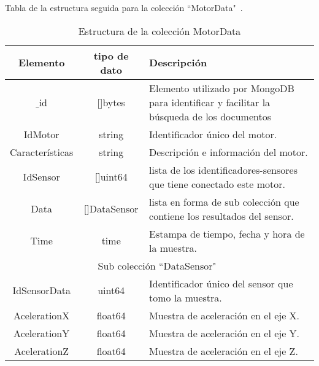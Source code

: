     \begin{table}[ht]
        \begin{center}
            Tabla de la estructura seguida para la colección ``MotorData"\ .\\

            \vspace{0.3cm}
            \begin{tabular}{|c|c|p{9cm}|}
                \hline
                Elemento        & tipo de dato & Descripción \\\hline\hline
                $\_$id      & []bytes  & Elemento utilizado por MongoDB para
                identificar y facilitar la búsqueda de los documentos\\\hline
                IdMotor         & string   & Identificador único del motor.\\\hline
                Características & string   & Descripción e información del motor.\\\hline
                IdSensor        & []uint64 & lista de los identificadores-sensores
                que tiene conectado este motor.\\\hline
                Data            & []DataSensor & lista en forma de sub colección
                que contiene los resultados del sensor.\\\hline
                Time            & time  & Estampa de tiempo, fecha y hora de la muestra.\\\hline
                \hline
                \multicolumn{3}{|c|}{Sub colección  ``DataSensor"\ }\\\hline\hline
                IdSensorData & uint64 & Identificador único del sensor que tomo la muestra.\\\hline
                AcelerationX & float64 & Muestra de aceleración en el eje X.\\\hline
                AcelerationY & float64 & Muestra de aceleración en el eje Y.\\\hline
                AcelerationZ & float64 & Muestra de aceleración en el eje Z.\\
                \hline
            \end{tabular}
        \end{center}
        \caption[Estructura de MotorData]{Estructura de la colección MotorData}
        \label{tab:MotorDatabson}
    \end{table}

